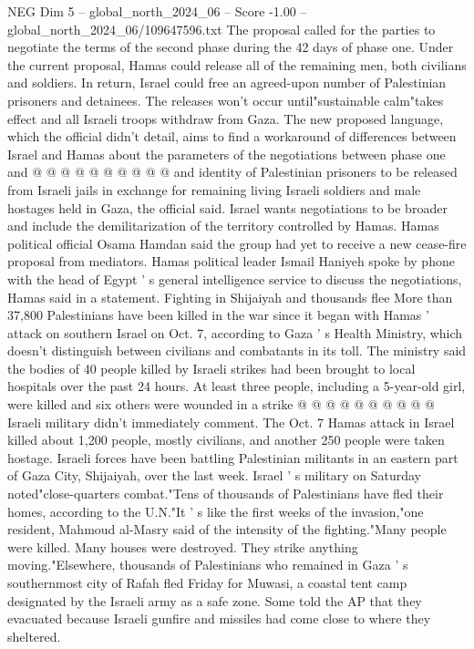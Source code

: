 \begin{textsample}{NEG Dim 5 – global\_north\_2024\_06 – Score -1.00 – global\_north\_2024\_06/109647596.txt}
The proposal called for the parties to negotiate the terms of the second phase during the 42 days of phase one.
Under the current proposal, Hamas could release all of the remaining men, both civilians and soldiers.
In return, Israel could free an agreed-upon number of Palestinian prisoners and detainees.
The releases won't occur until"sustainable calm"takes effect and all Israeli troops withdraw from Gaza.
The new proposed language, which the official didn't detail, aims to find a workaround of differences between Israel and Hamas about the parameters of the negotiations between phase one and @ @ @ @ @ @ @ @ @ @ and identity of Palestinian prisoners to be released from Israeli jails in exchange for remaining living Israeli soldiers and male hostages held in Gaza, the official said.
Israel wants negotiations to be broader and include the demilitarization of the territory controlled by Hamas.
Hamas political official Osama Hamdan said the group had yet to receive a new cease-fire proposal from mediators.
Hamas political leader Ismail Haniyeh spoke by phone with the head of Egypt ' s general intelligence service to discuss the negotiations, Hamas said in a statement.
Fighting in Shijaiyah and thousands flee More than 37,800 Palestinians have been killed in the war since it began with Hamas ' attack on southern Israel on Oct. 7, according to Gaza ' s Health Ministry, which doesn't distinguish between civilians and combatants in its toll.
The ministry said the bodies of 40 people killed by Israeli strikes had been brought to local hospitals over the past 24 hours.
At least three people, including a 5-year-old girl, were killed and six others were wounded in a strike @ @ @ @ @ @ @ @ @ @ Israeli military didn't immediately comment.
The Oct. 7 Hamas attack in Israel killed about 1,200 people, mostly civilians, and another 250 people were taken hostage.
Israeli forces have been battling Palestinian militants in an eastern part of Gaza City, Shijaiyah, over the last week.
Israel ' s military on Saturday noted"close-quarters combat."Tens of thousands of Palestinians have fled their homes, according to the U.N."It ' s like the first weeks of the invasion,"one resident, Mahmoud al-Masry said of the intensity of the fighting."Many people were killed.
Many houses were destroyed.
They strike anything moving."Elsewhere, thousands of Palestinians who remained in Gaza ' s southernmost city of Rafah fled Friday for Muwasi, a coastal tent camp designated by the Israeli army as a safe zone.
Some told the AP that they evacuated because Israeli gunfire and missiles had come close to where they sheltered.

\end{textsample}
